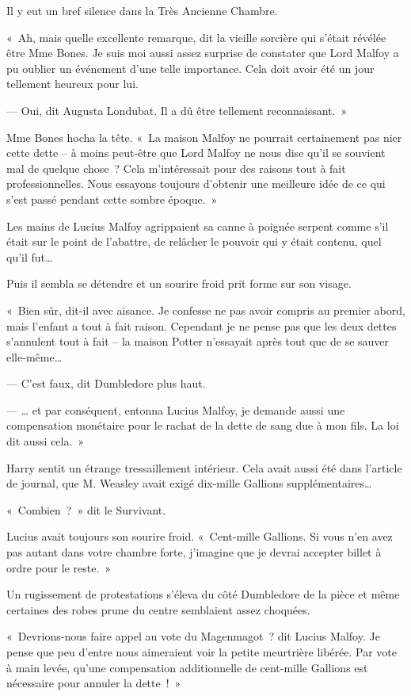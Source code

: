 Il y eut un bref silence dans la Très Ancienne Chambre.

«~Ah, mais quelle excellente remarque, dit la vieille sorcière qui s'était révélée être Mme Bones.
Je suis moi aussi assez surprise de constater que Lord Malfoy a pu oublier un événement d'une telle importance.
Cela doit avoir été un jour tellement heureux pour lui.

--- Oui, dit Augusta Londubat.
Il a dû être tellement reconnaissant.~»

Mme Bones hocha la tête.
«~La maison Malfoy ne pourrait certainement pas nier cette dette -- à moins peut-être que Lord Malfoy ne nous dise qu'il se souvient mal de quelque chose~?
Cela m'intéressait pour des raisons tout à fait professionnelles.
Nous essayons toujours d'obtenir une meilleure idée de ce qui s'est passé pendant cette sombre époque.~»

Les mains de Lucius Malfoy agrippaient sa canne à poignée serpent comme s'il était sur le point de l'abattre, de relâcher le pouvoir qui y était contenu, quel qu'il fut…

Puis il sembla se détendre et un sourire froid prit forme sur son visage.

«~Bien sûr, dit-il avec aisance.
Je confesse ne pas avoir compris au premier abord, mais l'enfant a tout à fait raison.
Cependant je ne pense pas que les deux dettes s'annulent tout à fait -- la maison Potter n'essayait après tout que de se sauver elle-même…

--- C'est faux, dit Dumbledore plus haut.

--- … et par conséquent, entonna Lucius Malfoy, je demande aussi une compensation monétaire pour le rachat de la dette de sang due à mon fils.
La loi dit aussi cela.~»

Harry sentit un étrange tressaillement intérieur.
Cela avait aussi été dans l'article de journal, que M. Weasley avait exigé dix-mille Gallions supplémentaires…

«~Combien~?~»
dit le Survivant.

Lucius avait toujours son sourire froid.
«~Cent-mille Gallions.
Si vous n'en avez pas autant dans votre chambre forte, j'imagine que je devrai accepter billet à ordre pour le reste.~»

Un rugissement de protestations s'éleva du côté Dumbledore de la pièce et même certaines des robes prune du centre semblaient assez choquées.

«~Devrions-nous faire appel au vote du Magenmagot~? dit Lucius Malfoy.
Je pense que peu d'entre nous aimeraient voir la petite meurtrière libérée.
Par vote à main levée, qu'une compensation additionnelle de cent-mille Gallions est nécessaire pour annuler la dette~!~»

